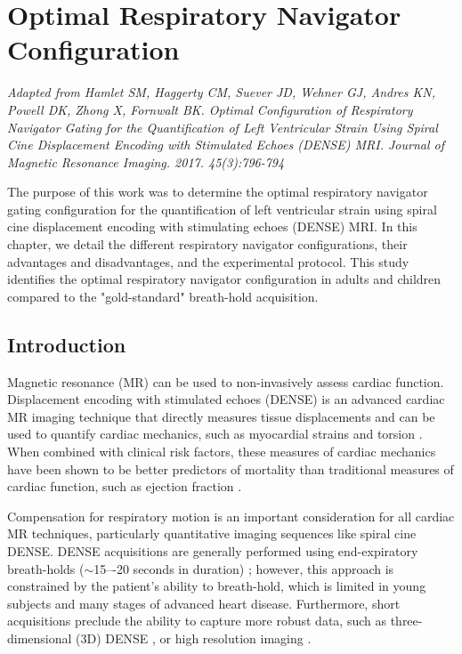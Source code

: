 \chapter{Optimal Respiratory Navigator Configuration}

\begin{center}
	\textit{Adapted from Hamlet SM, Haggerty CM, Suever JD, Wehner GJ, Andres KN, Powell DK, Zhong X, Fornwalt BK. Optimal Configuration of Respiratory Navigator Gating for the Quantification of Left Ventricular Strain Using Spiral Cine Displacement Encoding with Stimulated Echoes (DENSE) MRI. Journal of Magnetic Resonance Imaging. 2017. 45(3):796-794}
\end{center}

The purpose of this work was to determine the optimal respiratory navigator gating configuration for the quantification of left ventricular strain using spiral cine displacement encoding with stimulating echoes (DENSE) MRI.  In this chapter, we detail the different respiratory navigator configurations, their advantages and disadvantages, and the experimental protocol. This study identifies the optimal respiratory navigator configuration in adults and children compared to the "gold-standard" breath-hold acquisition.

\section{Introduction}
	Magnetic resonance (MR) can be used to non-invasively assess cardiac function. Displacement encoding with stimulated echoes (DENSE) is an advanced cardiac MR imaging technique that directly measures tissue displacements and can be used to quantify cardiac mechanics, such as myocardial strains and torsion \cite{Aletras1999b,Aletras1999c}. When combined with clinical risk factors, these measures of cardiac mechanics have been shown to be better predictors of mortality than traditional measures of cardiac function, such as ejection fraction \cite{Stanton2009}.
	 
	Compensation for respiratory motion is an important consideration for all cardiac MR techniques, particularly quantitative imaging sequences like spiral cine DENSE. DENSE acquisitions are generally performed using end-expiratory breath-holds ($\sim$15–-20 seconds in duration) \cite{Kim2004,Zhong2006a,Ernande2012,Zhong2010a,Aletras2005,Spottiswoode2007,Young2012c}; however, this approach is constrained by the patient's ability to breath-hold, which is limited in young subjects and many stages of advanced heart disease. Furthermore, short acquisitions preclude the ability to capture more robust data, such as three-dimensional (3D) DENSE \cite{Zhong2010a,Kar2014,Auger2012}, or high resolution imaging \cite{Wehner2014}.
	
